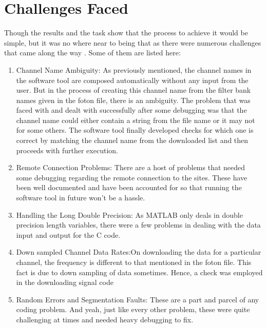 \documentclass[colorlinks=true,pdfstartview=FitV,linkcolor=blue,
            citecolor=red,urlcolor=magenta]{ligodoc}
\begin{document}
\section{Challenges Faced} 
Though the results and the task show that the process to achieve it would be simple, but it was no where near to being that as there were numerous challenges that came along the way . Some of them are listed here:
	\begin{enumerate}
		\item Channel Name Ambiguity: As previously mentioned, the channel names in the software tool are composed automatically without any input from the user. But in the process of creating this channel name from the filter bank names given in the foton file, there is an ambiguity. The problem that was faced with and dealt with successfully after some debugging was that the channel name could either contain a string from the file name or it may not for some others. The software tool finally developed checks for which one is correct by matching the channel name from the downloaded list and then proceeds with further execution.
		\item Remote Connection Problems: There are a host of problems that needed some debugging regarding the remote connection to the sites. These have been well documented and have been accounted for so that running the software tool in future won't be a hassle.
		\item Handling the Long Double Precision: As MATLAB only deals in double precision length variables, there were a few problems in dealing with the data input and output for the C code.
		\item Down sampled Channel Data Rates:On downloading the data for a particular channel, the frequency is different to that mentioned in the foton file. This fact is due to down sampling of data sometimes. Hence, a check was employed in the downloading signal code 
		\item Random Errors and Segmentation Faults: These are a part and parcel of any coding problem. And yeah, just like every other problem, these were quite challenging at times and needed heavy debugging to fix. 
		\end{enumerate}
\end{document}
